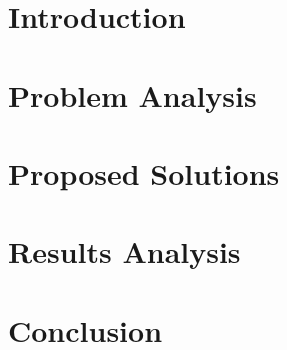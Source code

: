 \documentclass[12pt,a4paper,oneside]{article}
\begin{document}
\setcounter{tocdepth}{5}
\setcounter{secnumdepth}{5}
\author{Nunzio Lopardo}
\date{\today}
  

\tableofcontents %
\cleardoublepage %

\section{Introduction}
\label{ch:intro}



\section{Problem Analysis}
\label{ch:problem}


\section{Proposed Solutions}
\label{ch:solutions}


\section{Results Analysis}
\label{ch:results}


\section{Conclusion}
\label{ch:conclusion}







\end{document}
